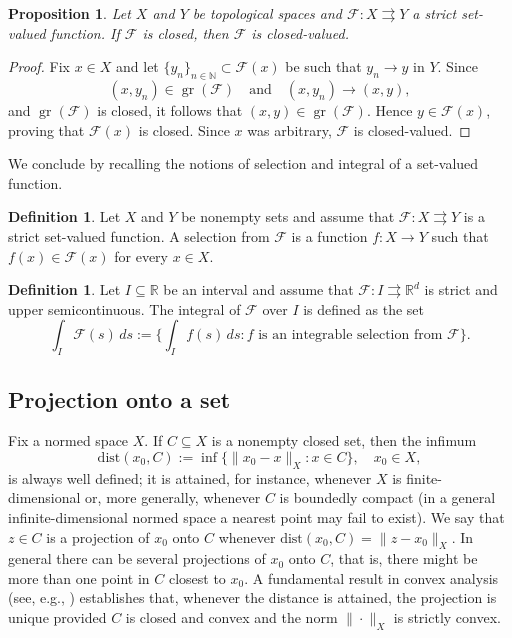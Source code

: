 \documentclass[11pt]{elsarticle}
\newtheorem{proposition}[theorem]{Proposition}
\theoremstyle{definition}
\newtheorem{definition}[theorem]{Definition}
\theoremstyle{remark}
\numberwithin{equation}{section}
\def\gr{\operatorname{gr}}
\begin{document}
	\begin{proposition}
		Let $X$ and $Y$ be topological spaces and $\mathcal{F}:X\rightrightarrows Y$ a strict set-valued function. If $\mathcal{F}$ is closed, then $\mathcal{F}$ is closed-valued.
	\end{proposition}
	
	\begin{proof}
		Fix $x\in X$ and let $\{y_n\}_{n\in\mathbb{N}}\subset \mathcal{F}(x)$ be such that $y_n\to y$ in $Y$. Since
		\[
		(x,y_n)\in \gr(\mathcal{F})
		\quad\text{and}\quad
		(x,y_n)\to (x,y),
		\]
		and $\gr(\mathcal{F})$ is closed, it follows that $(x,y)\in \gr(\mathcal{F})$. Hence $y\in \mathcal{F}(x)$, proving that $\mathcal{F}(x)$ is closed. Since $x$ was arbitrary, $\mathcal{F}$ is closed-valued.
	\end{proof}
	
	
	
	
	We conclude by recalling the notions of selection and integral of a set-valued function.
	
	\begin{definition}
		Let $X$ and $Y$ be nonempty sets and
		assume that $\mathcal{F}:X\rightrightarrows Y$ is a strict set-valued function.
		A selection from $\mathcal{F}$ is a function $f:X \to Y$
		such that $f(x)\in\mathcal{F}(x)$ for every $x\in X$.
	\end{definition}
	
	\begin{definition}
		Let $I\subseteq\mathbb{R}$ be an interval and
		assume that  $\mathcal{F}:I\rightrightarrows \mathbb{R}^d$ is strict and upper semicontinuous. The integral of $\mathcal{F}$ over $I$ is defined as the set
		\[
		\int_I \mathcal{F}(s) \, ds := \Big\{ \int_I f(s)\,ds : f \text{ is an integrable selection from } \mathcal{F} \Big\}.
		\]
	\end{definition}
	
	
	
	\subsection{Projection onto a set} \label{sec:projection}
	
	Fix a normed space $X$.
	If $C \subseteq X$ is a nonempty closed set, then the infimum
	\begin{equation*}
		\text{dist}(x_0,C) := \inf\{\|x_0 - x\|_X : x \in C\}, \quad x_0 \in X,
	\end{equation*}
	is always well defined; it is attained, for instance, whenever $X$ is finite-dimensional or, more generally, whenever $C$ is boundedly compact (in a general infinite-dimensional normed space a nearest point may fail to exist). We say that $z\in C$ is a projection of $x_0$ onto $C$ whenever $\text{dist}(x_0,C)=\|z - x_0\|_X$. In general there can be several projections of $x_0$ onto $C$, that is, there might be more than one point in $C$ closest to $x_0$.
	A fundamental result in convex analysis (see, e.g., \cite[Section~8.1]{boyd_vandenberghe_2004}) establishes that, whenever the distance is attained, the projection is unique provided $C$ is closed and convex and the norm $\|\cdot\|_X$ is strictly convex.
	
\end{document}
